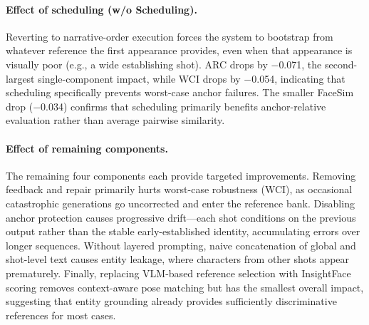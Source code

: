 \paragraph{Effect of scheduling (w/o Scheduling).}
Reverting to narrative-order execution forces the system to bootstrap from whatever reference the first appearance provides, even when that appearance is visually poor (e.g., a wide establishing shot). ARC drops by $-$0.071, the second-largest single-component impact, while WCI drops by $-$0.054, indicating that scheduling specifically prevents worst-case anchor failures. The smaller FaceSim drop ($-$0.034) confirms that scheduling primarily benefits anchor-relative evaluation rather than average pairwise similarity.

\paragraph{Effect of remaining components.}
The remaining four components each provide targeted improvements. Removing feedback and repair primarily hurts worst-case robustness (WCI), as occasional catastrophic generations go uncorrected and enter the reference bank. Disabling anchor protection causes progressive drift---each shot conditions on the previous output rather than the stable early-established identity, accumulating errors over longer sequences. Without layered prompting, naive concatenation of global and shot-level text causes entity leakage, where characters from other shots appear prematurely. Finally, replacing VLM-based reference selection with InsightFace scoring removes context-aware pose matching but has the smallest overall impact, suggesting that entity grounding already provides sufficiently discriminative references for most cases.

